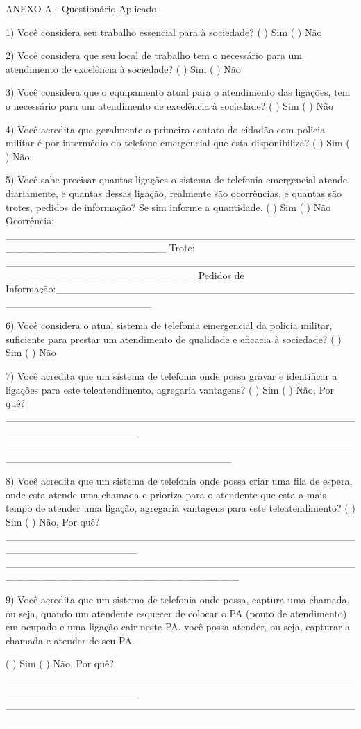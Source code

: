 ANEXO A - Questionário Aplicado

1) Você considera seu trabalho essencial para à sociedade?
( ) Sim
( ) Não

2) Você considera que seu local de trabalho tem o necessário para um atendimento de excelência à sociedade?
( ) Sim
( ) Não

3) Você considera que o equipamento atual para o atendimento das ligações, tem o necessário para um atendimento de excelência à sociedade?
( ) Sim
( ) Não

4) Você acredita que geralmente o primeiro contato do cidadão com policia militar é por intermédio do telefone emergencial que esta disponibiliza?
( ) Sim
( ) Não

5) Você sabe precisar quantas ligações o sistema de telefonia emergencial atende diariamente, e quantas dessas ligação, realmente são ocorrências, e quantas são trotes, pedidos de informação?
Se sim informe a quantidade.
( ) Sim
( ) Não
Ocorrência: ______________________________________________________________________
Trote: __________________________________________________________________________
Pedidos de Informação:_____________________________________________________________

6) Você considera o atual sistema de telefonia emergencial da policia militar, suficiente para prestar um atendimento de qualidade e eficacia à sociedade?
( ) Sim
( ) Não

7) Você acredita que um sistema de telefonia onde possa gravar e identificar a ligações para este teleatendimento, agregaria vantagens?
( ) Sim
( ) Não, Por quê? __________________________________________________________________
_______________________________________________________________________________

8) Você acredita que um sistema de telefonia onde possa criar uma fila de espera, onde esta atende uma chamada e prioriza para o atendente que esta a mais tempo de atender uma ligação, agregaria vantagens para este teleatendimento?
( ) Sim
( ) Não, Por quê? __________________________________________________________________
________________________________________________________________________________

9) Você acredita que um sistema de telefonia onde possa, captura uma chamada, ou seja, quando um atendente esquecer de colocar o PA (ponto de atendimento) em ocupado e uma ligação cair neste PA, você possa atender, ou seja, capturar a chamada e atender de seu PA.

( ) Sim
( ) Não, Por quê? __________________________________________________________________
________________________________________________________________________________

